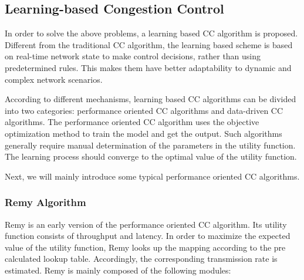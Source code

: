 \documentclass[conference]{IEEEtran}
\begin{document}
\subsection{Learning-based Congestion Control}

In order to solve the above problems, a learning based CC algorithm is proposed. Different from the traditional CC algorithm, the learning based scheme is based on real-time network state to make control decisions, rather than using predetermined rules. This makes them have better adaptability to dynamic and complex network scenarios.

According to different mechanisms, learning based CC algorithms can be divided into two categories: performance oriented CC algorithms and data-driven CC algorithms. The performance oriented CC algorithm uses the objective optimization method to train the model and get the output. Such algorithms generally require manual determination of the parameters in the utility function. The learning process should converge to the optimal value of the utility function.

Next, we will mainly introduce some typical performance oriented CC algorithms.
\subsubsection{Remy Algorithm}\quad

Remy\cite{a5} is an early version of the performance oriented CC algorithm. Its utility function consists of throughput and latency. In order to maximize the expected value of the utility function, Remy looks up the mapping according to the pre calculated lookup table. Accordingly, the corresponding transmission rate is estimated. Remy is mainly composed of the following modules: 
\end{document}
